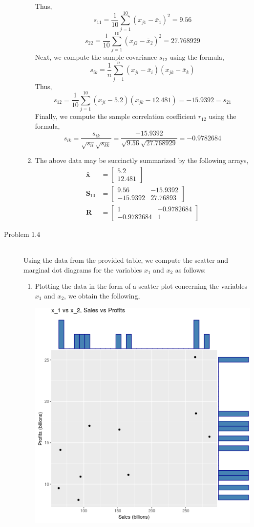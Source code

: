\documentclass[letterpaper,10pt]{article}
\begin{document}
\begin{description}
\begin{enumerate}[label=(\alph*)]
Thus,
\[s_{11}=\frac{1}{10}\sum_{j=1}^{10}(x_{j1}-\bar{x}_1)^2=9.56\]
\[s_{22}=\frac{1}{10}\sum_{j=1}^{10}(x_{j2}-\bar{x}_2)^2=27.768929\]
Next, we compute the sample covariance $s_{12}$ using the formula,
\[s_{ik}=\frac{1}{n}\sum_{j=1}^n(x_{ji}-\bar{x}_i)(x_{jk}-\bar{x}_k)\]
Thus,
\[s_{12}=\frac{1}{10}\sum_{j=1}^{10}(x_{ji}-5.2)(x_{jk}-12.481)=-15.9392=s_{21}\]
Finally, we compute the sample correlation coefficient $r_{12}$ using the formula,
\[s_{ik}=\frac{s_{ik}}{\sqrt{s_{ii}}\sqrt{s_{kk}}}=\frac{-15.9392}{\sqrt{9.56}\sqrt{27.768929}}=-0.9782684\]
\item The above data may be succinctly summarized by the following arrays,
\begin{align*}
\bar{\textbf{x}} &= \begin{bmatrix}
5.2\\12.481
\end{bmatrix}\\
\textbf{S}_{10} &= \begin{bmatrix}
9.56 & -15.9392\\ -15.9392 & 27.76893
\end{bmatrix}\\
\textbf{R} &= \begin{bmatrix}
1 & -0.9782684\\-0.9782684 & 1
\end{bmatrix}
\end{align*}
\end{enumerate}
\item[Problem 1.4]\hfill \\
Using the data from the provided table, we compute the scatter and marginal dot diagrams  for the variables $x_1$ and $x_2$ as follows:
\begin{enumerate}[label=(\alph*)]
\item Plotting the data in the form of a scatter plot concerning the variables $x_1$ and $x_2$, we obtain the following,
\begin{center}
\includegraphics[scale=0.75]{14scatter.png}

\end{center}
\end{enumerate}
\end{description}
\end{document}
